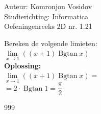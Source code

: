 \documentclass[a4paper]{article}
\begin{document}
	
	\noindent \large Auteur: Komronjon Vosidov \\
	\noindent \large Studierichting: Informatica\\
	\noindent \large Oefeningenreeks 2D nr. 1.21\\
	
	
	\medskip
	\normalsize
	
	Bereken de volgende limieten: \\
	
	$ \lim\limits_{x \to 1 } ((x+1) \operatorname {Bgtan} x) $ \\
	
	\textbf{Oplossing:}\\
	
	$ \lim\limits_{x \to 1 } ((x + 1) \operatorname {Bgtan} x)= $ \\
	
	$ = 2 \cdot \operatorname {Bgtan} 1=\dfrac{\pi}{2}$ \\

	
	
\begin{thebibliography}{999}
\end{thebibliography}	
\end{document}
